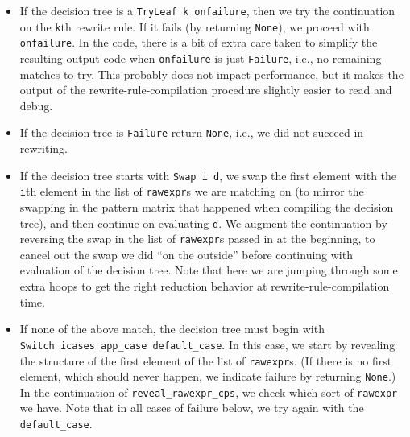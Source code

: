 \begin{itemize}
\begin{itemize}
\begin{itemize}
      \begin{itemize}
      \tightlist
      \item
        If the decision tree is a \texttt{TryLeaf\ k\ onfailure}, then
        we try the continuation on the \texttt{k}th rewrite rule. If it
        fails (by returning \texttt{None}), we proceed with
        \texttt{onfailure}. In the code, there is a bit of extra care
        taken to simplify the resulting output code when
        \texttt{onfailure} is just \texttt{Failure}, i.e., no remaining
        matches to try. This probably does not impact performance, but
        it makes the output of the rewrite-rule-compilation procedure
        slightly easier to read and debug.
      \item
        If the decision tree is \texttt{Failure} return \texttt{None},
        i.e., we did not succeed in rewriting.
      \item
        If the decision tree starts with
        \texttt{Swap\ i\ d\textquotesingle{}}, we swap the first element
        with the \texttt{i}th element in the list of \texttt{rawexpr}s
        we are matching on (to mirror the swapping in the pattern matrix
        that happened when compiling the decision tree), and then
        continue on evaluating \texttt{d\textquotesingle{}}. We augment
        the continuation by reversing the swap in the list of
        \texttt{rawexpr}s passed in at the beginning, to cancel out the
        swap we did ``on the outside'' before continuing with evaluation
        of the decision tree. Note that here we are jumping through some
        extra hoops to get the right reduction behavior at
        rewrite-rule-compilation time.
      \item
        If none of the above match, the decision tree must begin with
        \texttt{Switch\ icases\ app\_case\ default\_case}. In this case,
        we start by revealing the structure of the first element of the
        list of \texttt{rawexpr}s. (If there is no first element, which
        should never happen, we indicate failure by returning
        \texttt{None}.) In the continuation of
        \texttt{reveal\_rawexpr\_cps}, we check which sort of
        \texttt{rawexpr} we have. Note that in all cases of failure
        below, we try again with the \texttt{default\_case}.


\end{itemize}
\end{itemize}
\end{itemize}
\end{itemize}
